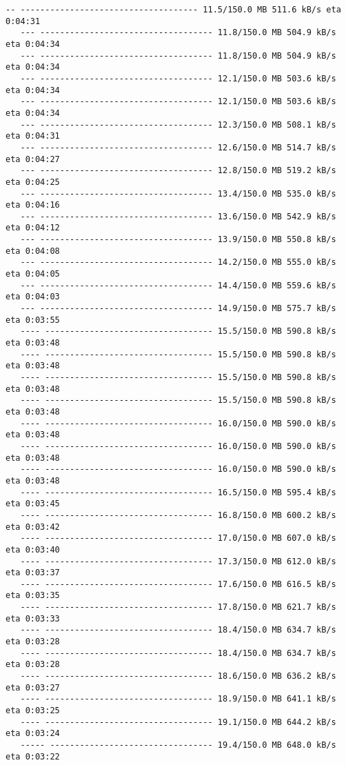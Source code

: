 \documentclass[11pt]{article}
\begin{document}
\begin{Verbatim}[commandchars=\\\{\}]
   -- ------------------------------------ 11.5/150.0 MB 511.6 kB/s eta 0:04:31
   --- ----------------------------------- 11.8/150.0 MB 504.9 kB/s eta 0:04:34
   --- ----------------------------------- 11.8/150.0 MB 504.9 kB/s eta 0:04:34
   --- ----------------------------------- 12.1/150.0 MB 503.6 kB/s eta 0:04:34
   --- ----------------------------------- 12.1/150.0 MB 503.6 kB/s eta 0:04:34
   --- ----------------------------------- 12.3/150.0 MB 508.1 kB/s eta 0:04:31
   --- ----------------------------------- 12.6/150.0 MB 514.7 kB/s eta 0:04:27
   --- ----------------------------------- 12.8/150.0 MB 519.2 kB/s eta 0:04:25
   --- ----------------------------------- 13.4/150.0 MB 535.0 kB/s eta 0:04:16
   --- ----------------------------------- 13.6/150.0 MB 542.9 kB/s eta 0:04:12
   --- ----------------------------------- 13.9/150.0 MB 550.8 kB/s eta 0:04:08
   --- ----------------------------------- 14.2/150.0 MB 555.0 kB/s eta 0:04:05
   --- ----------------------------------- 14.4/150.0 MB 559.6 kB/s eta 0:04:03
   --- ----------------------------------- 14.9/150.0 MB 575.7 kB/s eta 0:03:55
   ---- ---------------------------------- 15.5/150.0 MB 590.8 kB/s eta 0:03:48
   ---- ---------------------------------- 15.5/150.0 MB 590.8 kB/s eta 0:03:48
   ---- ---------------------------------- 15.5/150.0 MB 590.8 kB/s eta 0:03:48
   ---- ---------------------------------- 15.5/150.0 MB 590.8 kB/s eta 0:03:48
   ---- ---------------------------------- 16.0/150.0 MB 590.0 kB/s eta 0:03:48
   ---- ---------------------------------- 16.0/150.0 MB 590.0 kB/s eta 0:03:48
   ---- ---------------------------------- 16.0/150.0 MB 590.0 kB/s eta 0:03:48
   ---- ---------------------------------- 16.5/150.0 MB 595.4 kB/s eta 0:03:45
   ---- ---------------------------------- 16.8/150.0 MB 600.2 kB/s eta 0:03:42
   ---- ---------------------------------- 17.0/150.0 MB 607.0 kB/s eta 0:03:40
   ---- ---------------------------------- 17.3/150.0 MB 612.0 kB/s eta 0:03:37
   ---- ---------------------------------- 17.6/150.0 MB 616.5 kB/s eta 0:03:35
   ---- ---------------------------------- 17.8/150.0 MB 621.7 kB/s eta 0:03:33
   ---- ---------------------------------- 18.4/150.0 MB 634.7 kB/s eta 0:03:28
   ---- ---------------------------------- 18.4/150.0 MB 634.7 kB/s eta 0:03:28
   ---- ---------------------------------- 18.6/150.0 MB 636.2 kB/s eta 0:03:27
   ---- ---------------------------------- 18.9/150.0 MB 641.1 kB/s eta 0:03:25
   ---- ---------------------------------- 19.1/150.0 MB 644.2 kB/s eta 0:03:24
   ----- --------------------------------- 19.4/150.0 MB 648.0 kB/s eta 0:03:22

\end{Verbatim}
\end{document}
